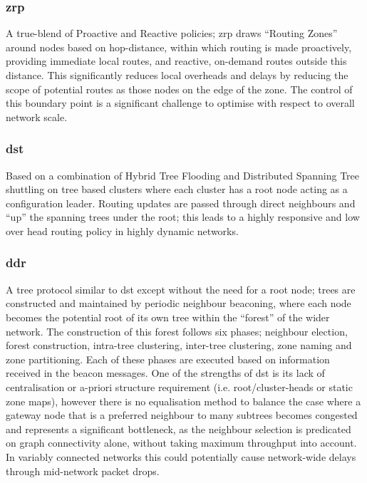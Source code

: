 {\subsubsection{\gls{zrp}}
A true-blend of Proactive and Reactive policies; \gls{zrp} draws ``Routing Zones'' around nodes based on hop-distance, within which routing is made proactively, providing immediate local routes, and reactive, on-demand routes outside this distance. This significantly reduces local overheads and delays by reducing the scope of potential routes as those nodes on the edge of the zone. The control of this boundary point is a significant challenge to optimise with respect to overall network scale. \\
\subsubsection{\gls{dst}}
Based on a combination of Hybrid Tree Flooding and Distributed Spanning Tree shuttling on tree based clusters where each cluster has a root node acting as a configuration leader. Routing updates are passed through direct neighbours and ``up'' the spanning trees under the root; this leads to a highly responsive and low over head routing policy in highly dynamic networks.\cite{Radhakrishnan1999}\\
\subsubsection{\gls{ddr}} 
A tree protocol similar to \gls{dst} except without the need for a root node; trees are constructed and maintained by periodic neighbour beaconing, where each node becomes the potential root of its own tree within the ``forest'' of the wider network. The construction of this forest follows six phases; neighbour election, forest construction, intra-tree clustering, inter-tree clustering, zone naming and zone partitioning. Each of these phases are executed based on information received in the beacon messages. One of the strengths of \gls{dst} is its lack of centralisation or a-priori structure requirement (i.e. root/cluster-heads or static zone maps), however there is no equalisation method to balance the case where a gateway node that is a preferred neighbour to many subtrees becomes congested and represents a significant bottleneck, as the neighbour selection is predicated on graph connectivity alone, without taking maximum throughput into account. In variably connected networks this could potentially cause network-wide delays through mid-network packet drops.\\
}
